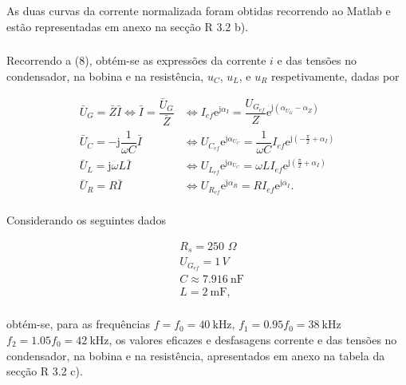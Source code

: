 \documentclass[a4paper, titlepage, portuguese]{article}
\newcommand{\eq}{\Leftrightarrow} %
\begin{document}
	As duas curvas da corrente normalizada foram obtidas recorrendo ao Matlab e estão representadas em anexo na secção R 3.2 b). \\ 
	

	\subsubsection{}
	
		Recorrendo a (8), obtém-se as expressões da corrente $i$ e das tensões no condensador, na bobina e na resistência, $u_C$, $u_L$, e $u_R$ respetivamente, dadas por
		
		\begin{align*}
			\bar{U}_G = \bar{Z} \bar{I} \eq \bar{I} = \dfrac{\bar{U}_G}{\bar{Z}} & \eq I_{ef} \mathrm{e}^{\mathrm{j} \alpha_I} = \dfrac{U_{G_{ef}}}{Z} \mathrm{e}^{\mathrm{j}\left(\alpha_{U_G} - \alpha_{Z}\right)}\\
			\bar{U}_C = -\mathrm{j} \dfrac{1}{\omega C} \bar{I} &\eq U_{C_{ef}} \mathrm{e}^{\mathrm{j} \alpha_{U_C}}= \dfrac{1}{\omega C}I_{ef} \mathrm{e}^{\mathrm{j} \left(-\frac{\pi}{2}+\alpha_I\right)} \\
			\bar{U}_L = \mathrm{j}\omega L \bar{I} &\eq U_{L_{ef}} \mathrm{e}^{\mathrm{j} \alpha_{U_C}}=\omega LI_{ef} \mathrm{e}^{\mathrm{j} \left(\frac{\pi}{2}+\alpha_I\right)}  \\
			\bar{U}_R = R \bar{I} &\eq {U}_{R_{ef}}\mathrm{e}^{\mathrm{j} \alpha_R}= R I_{ef} \mathrm{e}^{\mathrm{j} \alpha_I}.\\
		\end{align*}

		Considerando os seguintes dados
	
		\begin{align*}
			&R _ { s } = 250\hspace{4pt}\Omega \\
			&U_{G_{ef}} = 1\hspace{2pt}V\\
			&C \approx \SI{7.916}{\nano\farad}\\
			&L = \SI{2}{\milli\farad}, \\
		\end{align*}

		 obtém-se, para as frequências $f = f_0 = \SI{40}{\kilo\hertz}$, $f_1 = 0.95f_0= \SI{38}{\kilo\hertz}$ $f_2 = 1.05f_0 = \SI{42}{\kilo\hertz}$, os valores eficazes e desfasagens corrente e das tensões no condensador, na bobina e na resistência, apresentados em anexo na tabela da secção R 3.2 c).
	
\end{document}
